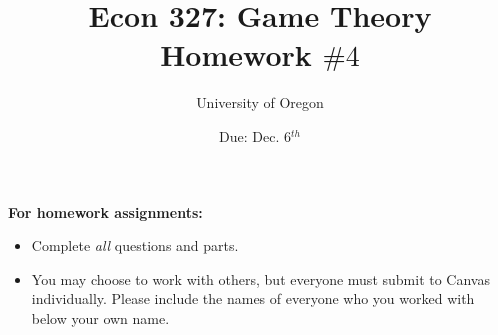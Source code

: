 \documentclass[addpoints ]{exam}
\title{
    \textbf{Econ 327: Game Theory} \\ 
    Homework $\#4$
    }
\author{University of Oregon}
\date{Due: Dec. 6$^{th}$}
\begin{document}
\maketitle

\begin{center}
  \gradetable[h][questions]
\end{center}

\vspace{0.5in}

\begin{center}
  \textbf{For homework assignments:}
\end{center}

\begin{itemize}


  \item Complete \textit{all} questions and parts.

  \item You may choose to work with others,
  but everyone must submit to Canvas individually.
  Please include the names of everyone who you worked with 
  below your own name.
 
\end{itemize}

\vspace{1.0in}


\vspace{0.5in}

\newpage
\end{document}
